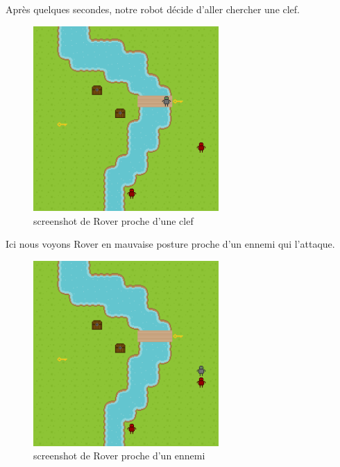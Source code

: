 \documentclass[a4paper 12pts]{article}
\begin{document}
Après quelques secondes, notre robot décide d'aller chercher une clef.

\begin{figure}[h]
   \includegraphics[width=200pt]{Illustration/screens/screen2.png}
\caption{screenshot de Rover proche d'une clef}
\end{figure}

\newpage


Ici nous voyons Rover en mauvaise posture proche d'un ennemi qui l'attaque.

\vspace{1cm}

\begin{figure}[h]   
	\includegraphics[width=200pt]{Illustration/screens/screen3.png}
\caption{screenshot de Rover proche d'un ennemi}
\end{figure}
\end{document}

